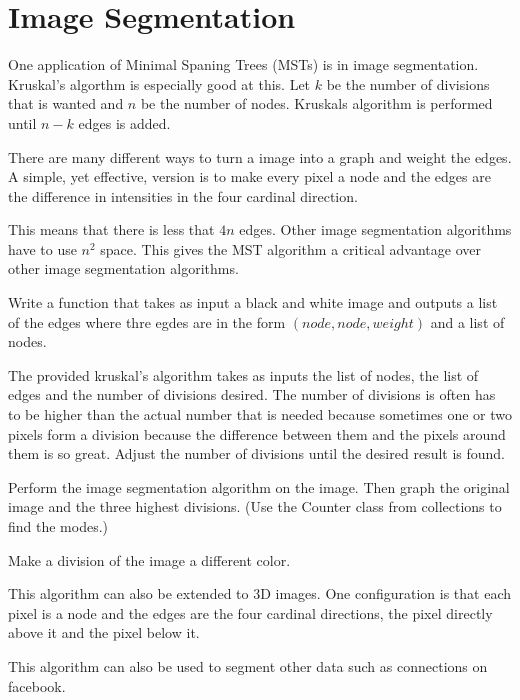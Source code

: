 \label{Ch:MSTImgSeg}


\section*{Image Segmentation}


One application of Minimal Spaning Trees (MSTs) is in image segmentation. Kruskal's algorthm is especially good at this. Let $k$ be the number of divisions that is wanted and $n$ be the number of nodes. Kruskals algorithm is performed until $n-k$ edges is added.

There are many different ways to turn a image into a graph and weight the edges. A simple, yet effective, version is to make every pixel a node and the edges are the difference in intensities in the four cardinal direction. 

This means that there is less that $4n$ edges. Other image segmentation algorithms have to use $n^2$ space. This gives the MST algorithm a critical advantage over other image segmentation algorithms. 

\begin{problem}
Write a function that takes as input a black and white image and outputs a list of the edges where thre egdes are in the form $(node,node,weight)$ and a list of nodes.
\end{problem}

The provided kruskal's algorithm takes as inputs the list of nodes, the list of edges and the number of divisions desired. The number of divisions is often has to be higher than the actual number that is needed because sometimes one or two pixels form a division because the difference between them and the pixels around them is so great. Adjust the number of divisions until the desired result is found.

\begin{problem}
Perform the image segmentation algorithm on the image. Then graph the original image and the three highest divisions. (Use the Counter class from collections to find the modes.) 
\end{problem}

\begin{problem}
Make a division of the image a different color.
\end{problem}

This algorithm can also be extended to 3D images. One configuration is that each pixel is a node and the edges are the four cardinal directions, the pixel directly above it and the pixel below it.

This algorithm can also be used to segment other data such as connections on facebook. 
